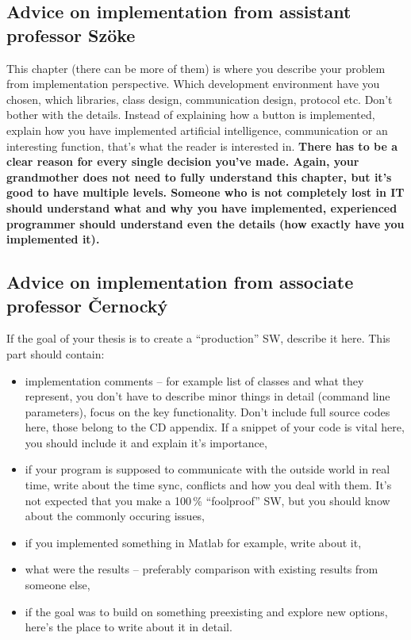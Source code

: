 {{\subsection*{Advice on implementation from assistant professor Szöke}
This chapter (there can be more of them) is where you describe your problem from implementation perspective. Which development environment have you chosen, which libraries, class design, communication design, protocol etc. Don't bother with the details. Instead of explaining how a button is implemented, explain how you have implemented artificial intelligence, communication or an interesting function, that's what the reader is interested in. \bf There has to be a clear reason for every single decision you've made. \rm Again, your grandmother does not need to fully understand this chapter, but it's good to have multiple levels. Someone who is not completely lost in IT should understand what and why you have implemented, experienced programmer should understand even the details (how exactly have you implemented it).

\subsection*{Advice on implementation from associate professor Černocký}

If the goal of your thesis is to create a ``production'' SW, describe it here. This part should contain:
\begin{itemize}
  \item{implementation comments -- for example list of classes and what they represent, you don't have to describe minor things in detail (command line parameters), focus on the key functionality. Don't include full source codes here, those belong to the CD appendix. If a snippet of your code is vital here, you should include it and explain it's importance,}
  \item{if your program is supposed to communicate with the outside world in real time, write about the time sync, conflicts and how you deal with them. It's not expected that you make a 100\,\% ``foolproof'' SW, but you should know about the commonly occuring issues,}
  \item{if you implemented something in Matlab for example, write about it,}
  \item{what were the results -- preferably comparison with existing results from someone else,}
  \item{if the goal was to build on something preexisting and explore new options, here's the place to write about it in detail.}
\end{itemize}

}}
